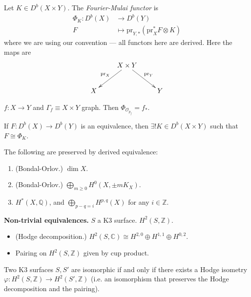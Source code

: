 \begin{definition}
\label{definition-}
Let $K \in D^b(X \times Y)$. The {\it Fourier-Mulai functor} is
\begin{align*}
\Phi_K: D^b(X) &\longrightarrow D^b(Y) \\
F &\longmapsto \text{pr}_{Y,*}(\text{pr}_X^*F \otimes K)
\end{align*}
where we are using our convention --- all functors here are derived. Here the
maps are
$$
\xymatrix{
& X \times Y\ar[dl]_{\text{pr}_X}\ar[dr]^{\text{pr}_Y}\\
X& & Y
}
$$
\end{definition}

\begin{example}
\label{example-Fourier-Mukai}
$f:X \to Y$ and $\Gamma_f \equiv X \times Y$ graph. Then
$\Phi_{\mathcal{O}_{p_f}}=f_*$.
\end{example}

\begin{theorem}[Orlov]
\label{theorem-Orlov}
If $F:D^b(X) \to D^b(Y)$ is an equivalence, then $\exists ! K \in D^b(X \times
Y)$ such that $F \cong \Phi_K$.
\end{theorem}

\begin{theorem}
\label{theorem-preserved-by-derived-equivalence}
The following are preserved by derived equivalence:
\begin{enumerate}
\item (Bondal-Orlov.) $\dim X$.
\item (Bondal-Orlov.) $\bigoplus_{m \geq 0}H^{0}(X,\pm m K_X)$.
\item $H^{*}(X,\mathbb{Q})$, and $\bigoplus_{p-q=i}H^{p,q}(X)$ for any $i \in
\mathbb{Z}$.
\end{enumerate}
\end{theorem}

\medskip\noindent
{\bf Non-trivial equivalences.} $S$ a K3 surface. $H^{2}(S,\mathbb{Z})$.
\begin{itemize}
\item (Hodge decomposition.) 
$H^{2}(S,\mathbb{C})\cong H^{2,0} \oplus H^{1,1} \oplus H^{0,2}$.
\item Pairing on $H^{2}(S,\mathbb{Z})$ given by cup product.
\end{itemize}

\begin{theorem}
\label{theorem-Torelli-for-K3}
Two K3 surfaces $S,S'$ are isomorphic if and only if there exists a Hodge
isometry $\varphi:H^{2}(S,\mathbb{Z})\to H^{2}(S',\mathbb{Z})$ 
(i.e. an isomorphism that preserves the Hodge decomposition and the pairing).
\end{theorem}

